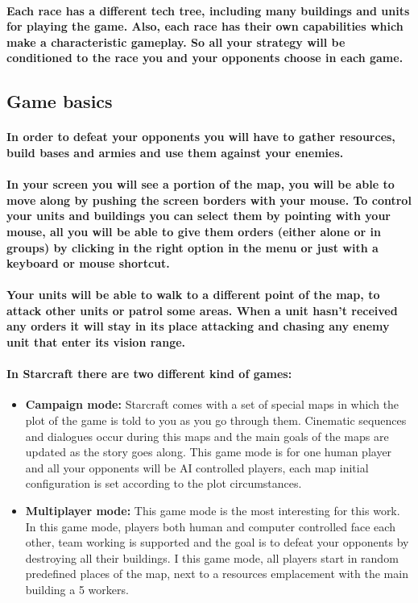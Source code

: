 \documentclass[a4paper,10pt]{article}
\newcommand{\p}[1]{\paragraph{\indent\textnormal{#1}}}
\begin{document}
    \p{Each race has a different tech tree, including many buildings and units for playing the game. Also, each race has their own capabilities which make a characteristic gameplay. So all your strategy will be conditioned to the race you and your opponents choose in each game.}

  
  \subsection{Game basics}

    \p{In order to defeat your opponents you will have to gather resources, build bases and armies and use them against your enemies.}

    \p{In your screen you will see a portion of the map, you will be able to move along by pushing the screen borders with your mouse. To control your units and buildings you can select them by pointing with your mouse, all you will be able to give them orders (either alone or in groups) by clicking in the right option in the menu or just with a keyboard or mouse shortcut.}

    \p{Your units will be able to walk to a different point of the map, to attack other units or patrol some areas. When a unit hasn't received any orders it will stay in its place attacking and chasing any enemy unit that enter its vision range.}

    \p{In Starcraft there are two different kind of games:}

    \begin{itemize}
     \item \textbf{Campaign mode:} Starcraft comes with a set of special maps in which the plot of the game is told to you as you go through them. Cinematic sequences and dialogues occur during this maps and the main goals of the maps are updated as the story goes along. This game mode is for one human player and all your opponents will be AI controlled players, each map initial configuration is set according to the plot circumstances.

    \item \textbf{Multiplayer mode:} This game mode is the most interesting for this work. In this game mode, players both human and computer controlled face each other, team working is supported and the goal is to defeat your opponents by destroying all their buildings. I this game mode, all players start in random predefined places of the map, next to a resources emplacement with the main building a 5 workers.
    \end{itemize}
\end{document}
